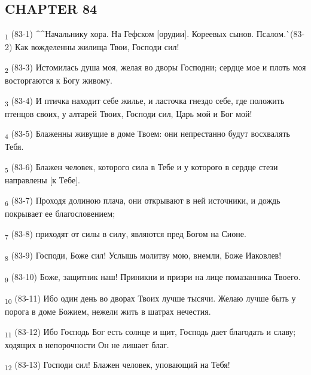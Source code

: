 \subsection{CHAPTER 84}
\begin{tcolorbox}
\textsubscript{1} (83-1) ^^Начальнику хора. На Гефском [орудии]. Кореевых сынов. Псалом.^^ (83-2) Как вожделенны жилища Твои, Господи сил!
\end{tcolorbox}
\begin{tcolorbox}
\textsubscript{2} (83-3) Истомилась душа моя, желая во дворы Господни; сердце мое и плоть моя восторгаются к Богу живому.
\end{tcolorbox}
\begin{tcolorbox}
\textsubscript{3} (83-4) И птичка находит себе жилье, и ласточка гнездо себе, где положить птенцов своих, у алтарей Твоих, Господи сил, Царь мой и Бог мой!
\end{tcolorbox}
\begin{tcolorbox}
\textsubscript{4} (83-5) Блаженны живущие в доме Твоем: они непрестанно будут восхвалять Тебя.
\end{tcolorbox}
\begin{tcolorbox}
\textsubscript{5} (83-6) Блажен человек, которого сила в Тебе и у которого в сердце стези направлены [к Тебе].
\end{tcolorbox}
\begin{tcolorbox}
\textsubscript{6} (83-7) Проходя долиною плача, они открывают в ней источники, и дождь покрывает ее благословением;
\end{tcolorbox}
\begin{tcolorbox}
\textsubscript{7} (83-8) приходят от силы в силу, являются пред Богом на Сионе.
\end{tcolorbox}
\begin{tcolorbox}
\textsubscript{8} (83-9) Господи, Боже сил! Услышь молитву мою, внемли, Боже Иаковлев!
\end{tcolorbox}
\begin{tcolorbox}
\textsubscript{9} (83-10) Боже, защитник наш! Приникни и призри на лице помазанника Твоего.
\end{tcolorbox}
\begin{tcolorbox}
\textsubscript{10} (83-11) Ибо один день во дворах Твоих лучше тысячи. Желаю лучше быть у порога в доме Божием, нежели жить в шатрах нечестия.
\end{tcolorbox}
\begin{tcolorbox}
\textsubscript{11} (83-12) Ибо Господь Бог есть солнце и щит, Господь дает благодать и славу; ходящих в непорочности Он не лишает благ.
\end{tcolorbox}
\begin{tcolorbox}
\textsubscript{12} (83-13) Господи сил! Блажен человек, уповающий на Тебя!
\end{tcolorbox}
